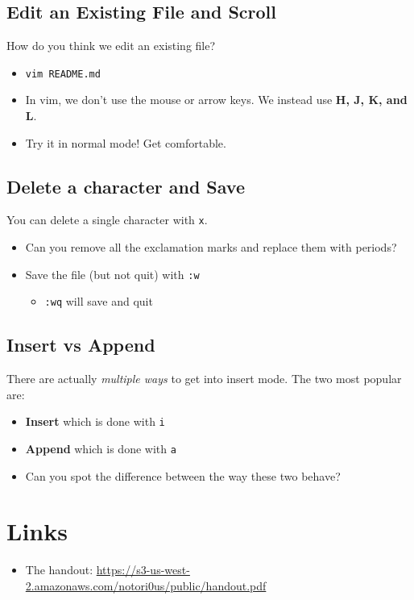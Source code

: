 \documentclass[aspectratio=1610]{beamer}                  %
\newcommand{\srule}{
	\rule{\textwidth}{1pt}\\
}
\newlength{\subsecwidth}
\newenvironment{slide}{
	\begin{frame}                                    %
		\settowidth{\subsecwidth}{\insertsubsection} %
		\ifthenelse{\dimtest{\subsecwidth}{<}{1pt}}{ %
			\frametitle{\huge \insertsection\\             %
				\vspace{-1ex}                            %
			}
		}{                                           %
			\frametitle{\huge \insertsection\ -- \insertsubsection\\ %
				\vspace{-1ex}                            %
			}
		}
		\Large                                       %
	}{
	\end{frame}
}
\begin{document}
\subsection{Edit an Existing File and Scroll}
\begin{slide}
    How do you think we edit an existing file?
    \pause
    \begin{itemize}
        \item \texttt{vim README.md}
        \item In vim, we don't use the mouse or arrow keys. We instead use \textbf{H, J, K, and L}.
        \item Try it in normal mode! Get comfortable.
    \end{itemize}
\end{slide}

\subsection{Delete a character and Save}
\begin{slide}
    You can delete a single character with \texttt{x}.
    \begin{itemize}
        \item Can you remove all the exclamation marks and replace them with periods?
            \pause

        \item Save the file (but not quit) with \texttt{:w}
            \begin{itemize}
                \item \texttt{:wq} will save and quit
            \end{itemize}
    \end{itemize}
\end{slide}

\subsection{Insert vs Append}
\begin{slide}
    There are actually \textit{multiple ways} to get into insert mode. The two most popular are:
    \begin{itemize}
        \item \textbf{Insert} which is done with \texttt{i}
        \item \textbf{Append} which is done with \texttt{a}

        \item Can you spot the difference between the way these two behave?
    \end{itemize}
\end{slide}

\section{Links}
\begin{slide}
    \begin{itemize}
        \item The handout: \url{https://s3-us-west-2.amazonaws.com/notori0us/public/handout.pdf}
    \end{itemize}
\end{slide}
\end{document}
